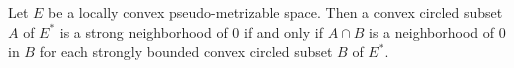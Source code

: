 Let $E$ be a locally convex pseudo-metrizable space. Then a convex circled subset $A$ of $E^*$ is a strong neighborhood of $0$ if and only if $A \cap B$ is a neighborhood of $0$ in $B$ for each strongly bounded convex circled subset $B$ of $E^*$.
